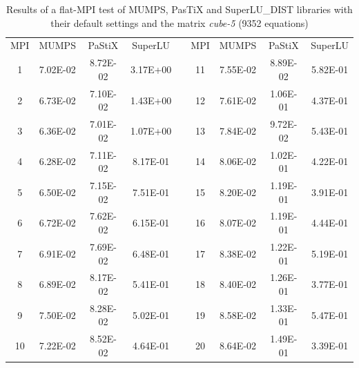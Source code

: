 \begin{table}[ht]
\centering
\begin{tabular}{|c|c|c|c|l|c|c|c|c|}
\cline{1-4} \cline{6-9}
MPI & MUMPS    & PaStiX   & SuperLU  &  & MPI & MUMPS    & PaStiX   & SuperLU  \\ \cline{1-4} \cline{6-9} 
1   & 7.02E-02 & 8.72E-02 & 3.17E+00 &  & 11  & 7.55E-02 & 8.89E-02 & 5.82E-01 \\ \cline{1-4} \cline{6-9} 
2   & 6.73E-02 & 7.10E-02 & 1.43E+00 &  & 12  & 7.61E-02 & 1.06E-01 & 4.37E-01 \\ \cline{1-4} \cline{6-9} 
3   & 6.36E-02 & 7.01E-02 & 1.07E+00 &  & 13  & 7.84E-02 & 9.72E-02 & 5.43E-01 \\ \cline{1-4} \cline{6-9} 
4   & 6.28E-02 & 7.11E-02 & 8.17E-01 &  & 14  & 8.06E-02 & 1.02E-01 & 4.22E-01 \\ \cline{1-4} \cline{6-9} 
5   & 6.50E-02 & 7.15E-02 & 7.51E-01 &  & 15  & 8.20E-02 & 1.19E-01 & 3.91E-01 \\ \cline{1-4} \cline{6-9} 
6   & 6.72E-02 & 7.62E-02 & 6.15E-01 &  & 16  & 8.07E-02 & 1.19E-01 & 4.44E-01 \\ \cline{1-4} \cline{6-9} 
7   & 6.91E-02 & 7.69E-02 & 6.48E-01 &  & 17  & 8.38E-02 & 1.22E-01 & 5.19E-01 \\ \cline{1-4} \cline{6-9} 
8   & 6.89E-02 & 8.17E-02 & 5.41E-01 &  & 18  & 8.40E-02 & 1.26E-01 & 3.77E-01 \\ \cline{1-4} \cline{6-9} 
9   & 7.50E-02 & 8.28E-02 & 5.02E-01 &  & 19  & 8.58E-02 & 1.33E-01 & 5.47E-01 \\ \cline{1-4} \cline{6-9} 
10  & 7.22E-02 & 8.52E-02 & 4.64E-01 &  & 20  & 8.64E-02 & 1.49E-01 & 3.39E-01 \\ \cline{1-4} \cline{6-9} 
\end{tabular}
\caption{Results of a flat-MPI test of MUMPS, PasTiX and SuperLU\_DIST libraries with their default settings and the matrix \textit{cube-5} (9352 equations)}
\label{table:lc-cube-5-result}
\end{table}


